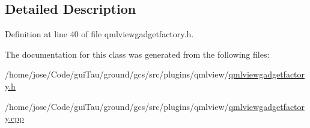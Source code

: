 \subsection{Detailed Description}


Definition at line 40 of file qmlviewgadgetfactory.\-h.



The documentation for this class was generated from the following files\-:\begin{DoxyCompactItemize}
\item 
/home/jose/\-Code/gui\-Tau/ground/gcs/src/plugins/qmlview/\hyperlink{qmlviewgadgetfactory_8h}{qmlviewgadgetfactory.\-h}\item 
/home/jose/\-Code/gui\-Tau/ground/gcs/src/plugins/qmlview/\hyperlink{qmlviewgadgetfactory_8cpp}{qmlviewgadgetfactory.\-cpp}\end{DoxyCompactItemize}
